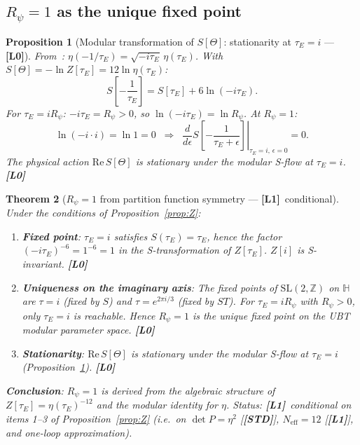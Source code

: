 \documentclass[12pt,a4paper]{article}
\newtheorem{theorem}{Theorem}[section]
\newtheorem{proposition}[theorem]{Proposition}
\theoremstyle{definition}\newtheorem{definition}[theorem]{Definition}
\theoremstyle{remark}\newtheorem{remark}[theorem]{Remark}
\newcommand{\Lz}{\textbf{[L0]}}
\newcommand{\Lo}{\textbf{[L1]}}
\newcommand{\STD}{\textbf{[STD]}}
\newcommand{\ZZ}{\mathbb{Z}}
\begin{document}
\subsection{$R_\psi = 1$ as the unique fixed point}

\begin{proposition}[Modular transformation of $S{[\Theta]}$: stationarity at $\tau_E=i$ — \Lz]
\label{prop:Smod}
From~\cite[§9.2]{apostol_modular}:
$\eta(-1/\tau_E) = \sqrt{-i\tau_E}\,\eta(\tau_E)$.
With $S[\Theta] = -\ln Z[\tau_E] = 12\ln\eta(\tau_E)$:
\[
  S\!\left[-\frac{1}{\tau_E}\right]
  = S[\tau_E] + 6\ln(-i\tau_E).
\]
For $\tau_E = iR_\psi$: $-i\tau_E = R_\psi > 0$, so
$\ln(-i\tau_E) = \ln R_\psi$.  At $R_\psi = 1$:
\[
  \ln(-i \cdot i) = \ln 1 = 0
  \;\;\Longrightarrow\;\;
  \left.\frac{d}{d\epsilon}
  S\!\left[-\frac{1}{\tau_E+\epsilon}\right]\right|_{\tau_E=i,\,\epsilon=0}
  = 0.
\]
The physical action $\mathrm{Re}\,S[\Theta]$ is stationary under the
modular S-flow at $\tau_E = i$. \Lz
\end{proposition}

\begin{theorem}[$R_\psi = 1$ from partition function symmetry — \Lo\ conditional]
\label{thm:fixed}
Under the conditions of Proposition~\ref{prop:Z}:
\begin{enumerate}
\item \textbf{Fixed point}: $\tau_E = i$ satisfies $S(\tau_E)=\tau_E$,
  hence the factor $(-i\tau_E)^{-6}=1^{-6}=1$ in the S-transformation
  of $Z[\tau_E]$.  $Z[i]$ is S-invariant. \Lz
\item \textbf{Uniqueness on the imaginary axis}: The fixed points of
  $\mathrm{SL}(2,\ZZ)$ on $\mathbb{H}$ are $\tau=i$ (fixed by $S$)
  and $\tau=e^{2\pi i/3}$ (fixed by $ST$).  For $\tau_E=iR_\psi$ with
  $R_\psi>0$, only $\tau_E=i$ is reachable.  Hence $R_\psi=1$ is the
  \emph{unique} fixed point on the UBT modular parameter space. \Lz
\item \textbf{Stationarity}: $\mathrm{Re}\,S[\Theta]$ is stationary
  under the modular S-flow at $\tau_E=i$ (Proposition~\ref{prop:Smod}).
  \Lz
\end{enumerate}
\textbf{Conclusion}: $R_\psi = 1$ is derived from the algebraic
structure of $Z[\tau_E] = \eta(\tau_E)^{-12}$ and the modular
identity for $\eta$.  Status: \Lo\ conditional on items 1--3 of
Proposition~\ref{prop:Z} (i.e.\ on $\det P=\eta^2$ [\STD],
$N_{\mathrm{eff}}=12$ [\Lo], and one-loop approximation).
\end{theorem}
\end{document}
